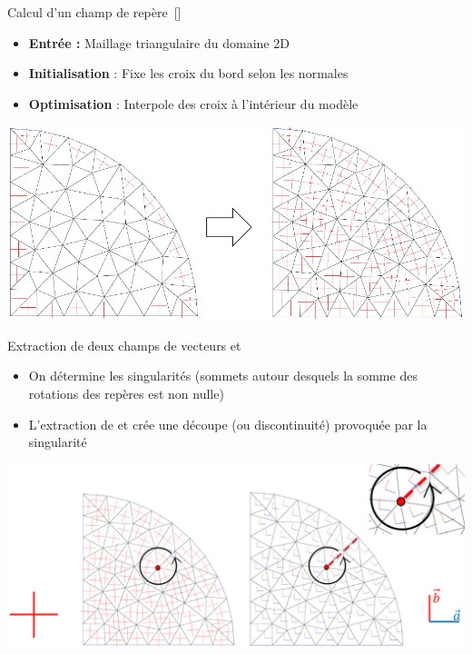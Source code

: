 \begin{frame}{Calcul d'un champ de repère~[\cite{palacios_rotational_2007}]}
    \begin{itemize}
        \item \textbf{Entrée :} Maillage triangulaire du domaine 2D
        \item \textbf{Initialisation} : Fixe les croix du bord selon les normales
        \item \textbf{Optimisation} : Interpole des croix à l’intérieur du modèle
    \end{itemize}
    
    \vspace{1em}
    \centering
    \includegraphics[width=\linewidth]{img/new_images/compute_ff2D.png}
\end{frame}

\begin{frame}{Extraction de deux champs de vecteurs  et }
    \centering
	\begin{itemize}
        \item On détermine les singularités (sommets autour desquels la somme des rotations des repères est non nulle)
        \item L'extraction de  et  crée une découpe (ou discontinuité) provoquée par la singularité
    \end{itemize}
    \includegraphics[width=\linewidth]{img/new_images/ff_to_vf.png}
\end{frame}

